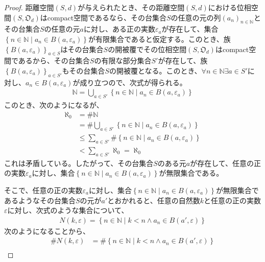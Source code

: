 \documentclass[dvipdfmx]{jsarticle}
\begin{document}
\begin{proof}
距離空間$(S,d)$が与えられたとき、その距離空間$(S,d)$における位相空間$\left( S,\mathfrak{O}_{d} \right)$はcompact空間であるなら、その台集合$S$の任意の元の列$\left( a_{n} \right)_{n \in \mathbb{N}}$とその台集合$S$の任意の元$a$に対し、ある正の実数$\varepsilon_{a}$が存在して、集合$\left\{ n \in \mathbb{N} \middle| a_{n} \in B\left( a,\varepsilon_{a} \right) \right\}$が有限集合であると仮定する。このとき、族$\left\{ B\left( a,\varepsilon_{a} \right) \right\}_{a \in S}$はその台集合$S$の開被覆でその位相空間$\left( S,\mathfrak{O}_{d} \right)$はcompact空間であるから、その台集合$S$の有限な部分集合$S'$が存在して、族$\left\{ B\left( a,\varepsilon_{a} \right) \right\}_{a \in S'}$もその台集合$S$の開被覆となる。このとき、$\forall n \in \mathbb{N}\exists a \in S'$に対し、$a_{n} \in B\left( a,\varepsilon_{a} \right)$が成り立つので、次式が得られる。
\begin{align*}
\mathbb{N} = \bigcup_{a \in S'} \left\{ n \in \mathbb{N} \middle| a_{n} \in B\left( a,\varepsilon_{a} \right) \right\}
\end{align*}
このとき、次のようになるが、
\begin{align*}
\aleph_{0} &= {\#}\mathbb{N}\\
&= {\#}{\bigcup_{a \in S'} \left\{ n \in \mathbb{N} \middle| a_{n} \in B\left( a,\varepsilon_{a} \right) \right\}}\\
&\leq \sum_{a \in S'} {{\#}\left\{ n \in \mathbb{N} \middle| a_{n} \in B\left( a,\varepsilon_{a} \right) \right\}}\\
&< \sum_{a \in S'} \aleph_{0} = \aleph_{0}
\end{align*}
これは矛盾している。したがって、その台集合$S$のある元$a$が存在して、任意の正の実数$\varepsilon_{a}$に対し、集合$\left\{ n \in \mathbb{N} \middle| a_{n} \in B\left( a,\varepsilon_{a} \right) \right\}$が無限集合である。\par
そこで、任意の正の実数$\varepsilon_{a}$に対し、集合$\left\{ n \in \mathbb{N} \middle| a_{n} \in B\left( a,\varepsilon_{a} \right) \right\}$が無限集合であるようなその台集合$S$の元が$a'$とおかれると、任意の自然数$k$と任意の正の実数$\varepsilon$に対し、次式のような集合について、
\begin{align*}
N(k,\varepsilon) = \left\{ n \in \mathbb{N} \middle| k < n \land a_{n} \in B\left( a',\varepsilon \right) \right\}
\end{align*}
次のようになることから、
\begin{align*}
{\#}{N(k,\varepsilon)} &= {\#}\left\{ n \in \mathbb{N} \middle| k < n \land a_{n} \in B\left( a',\varepsilon \right) \right\}\\

\end{align*}
\end{proof}
\end{document}
